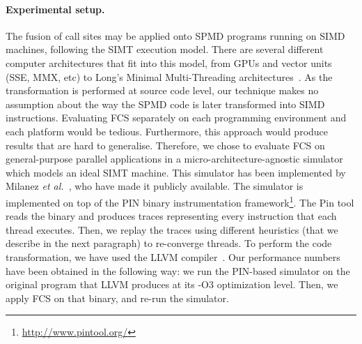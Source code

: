 \documentclass[times,10pt,twocolumn]{article}
\begin{document}
\paragraph{Experimental setup.}
The fusion of call sites may be applied onto SPMD programs running on SIMD
machines, following the SIMT execution model.
There are several different computer architectures that fit into this model,
from GPUs and vector units (SSE, MMX, etc) to Long's Minimal Multi-Threading
architectures~\cite{Long10}.
As the transformation is performed at source code level, our technique makes no
assumption about the way the SPMD code is later transformed into SIMD
instructions.
Evaluating FCS separately on each programming environment and each platform
would be tedious.
Furthermore, this approach would produce results that are hard to generalise.
Therefore, we chose to evaluate FCS on general-purpose parallel
applications in a micro-architecture-agnostic simulator which models an ideal
SIMT machine.
This simulator has been implemented by Milanez {\em et al.}~\cite{Milanez14},
who have made it publicly available.
The simulator is implemented on top of the PIN binary instrumentation
framework\footnote{\url{http://www.pintool.org/}}.
The Pin tool reads the binary and produces traces representing every
instruction that each thread executes.
Then, we replay the traces using different heuristics (that we describe in the
next paragraph) to re-converge threads.
To perform the code transformation, we have used the LLVM
compiler~\cite{Lattner04}.
Our performance numbers have been obtained in the following way:
we run the PIN-based simulator on the original program that LLVM produces at
its -O3 optimization level.
Then, we apply FCS on that binary, and re-run the simulator.
\end{document}
